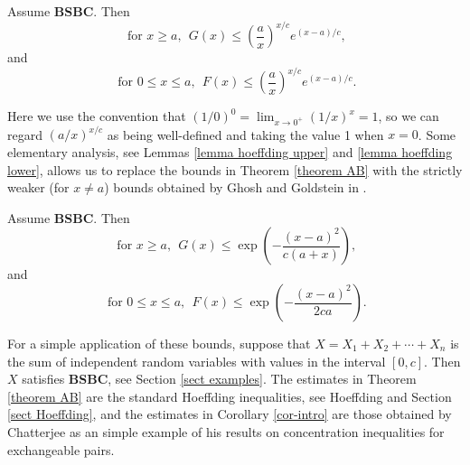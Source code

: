 \documentclass[smallextended,envcountsect]{svjour3}
\begin{document}
\begin{theorem}  \label{theorem AB}
Assume {\bf BSBC}.  Then
  \begin{equation} \label{AB upper}
   \text{ for } x\ge a, \ \       G(x)  \le \left(\frac{a}{x}\right)^{x/c} e^{(x-a)/c},
    \end{equation}
and
    \begin{equation} \label{AB lower}
   \text{ for } 0 \le x \le a, \ \    F(x) \le \left(\frac{a}{x}\right)^{x/c} e^{(x-a)/c}.
    \end{equation}
 \end{theorem}

Here we use the convention that
$(1/0)^0  = \lim_{x \to 0^+} (1/x)^x = 1$, so we can regard $\displaystyle{ \left(a/x\right)^{x/c}}$ as being well-defined and taking the value 1 when $x = 0$. Some elementary analysis, see Lemmas \ref{lemma hoeffding upper} and \ref{lemma hoeffding lower}, allows us to replace the bounds in Theorem \ref{theorem AB} with the strictly weaker (for $x \neq a$) bounds obtained by Ghosh and Goldstein in \cite{GhoshGold}.

\begin{corollary}  \label{cor-intro}  Assume {\bf BSBC}.  Then
   \begin{equation} \label{G-intro}
   \text{ for } x\ge a, \ \    G(x) \le \exp\left(-\frac{(x-a)^2}{c(a+x)}\right),
   \end{equation}
and
    \begin{equation} \label{F-intro}
   \text{ for } 0 \le x \le a, \ \   F(x)  \le \exp\left(-\frac{(x-a)^2}{2ca}\right).
   \end{equation}
 \end{corollary}

\vspace{2ex}

For a simple application of these bounds, suppose that $X = X_1+X_2+ \cdots + X_n$ is the sum of independent random variables with values in the interval $[0,c]$.  Then $X$ satisfies {\bf BSBC}, see Section \ref{sect examples}.  The estimates in Theorem \ref{theorem AB} are the standard Hoeffding inequalities, see Hoeffding \cite{hoeffding} and Section \ref{sect Hoeffding}, and the estimates in Corollary \ref{cor-intro} are those obtained by Chatterjee \cite{chatterjee} as an simple example of his results on concentration inequalities for exchangeable pairs.

\vspace{2ex}
\end{document}
